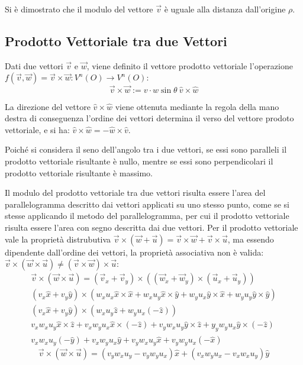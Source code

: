 \documentclass{article}
\numberwithin{equation}{subsection}
\begin{document}
Si è dimostrato che il modulo del vettore $\vec{v}$ è uguale alla distanza dall'origine $\rho$.

\subsection{Prodotto Vettoriale tra due Vettori}
Dati due vettori $\vec{v}$ e $\vec{w}$, viene definito il vettore prodotto vettoriale l'operazione $f(\vec{v},\vec{w})=\vec{v}\times\vec{w}:V^n(O)\to V^n(O)$: 
\begin{equation}
    \vec{v}\times\vec{w} := v\cdot w\sin\theta\:\hat{v}\times\hat{w}
\end{equation}
    
La direzione del vettore $\hat{v}\times\hat{w}$ viene ottenuta mediante la regola della mano destra
di conseguenza l'ordine dei vettori determina il verso del vettore prodoto vettoriale, e si ha: $\hat{v}\times\hat{w} = -\hat{w}\times\hat{v}$.



Poiché si considera il seno dell'angolo tra i due vettori, se essi sono paralleli il prodotto vettoriale risultante è nullo, mentre se essi 
sono perpendicolari il prodotto vettoriale risultante è massimo. 


Il modulo del prodotto vettoriale tra due vettori risulta essere l'area del 
parallelogramma descritto dai vettori applicati su uno stesso punto, come se si stesse applicando il metodo del parallelogramma, per cui 
il prodotto vettoriale risulta essere l'area con segno descritta dai due vettori. 
Per il prodotto vettoriale vale la proprietà distrubutiva 
$\vec{v}\times(\vec{w} +\vec{u}) = \vec{v}\times\vec{w} + \vec{v}\times\vec{u}$, 
ma essendo 
dipendente dall'ordine dei vettori, la proprietà associativa 
non è valida: 
$\vec{v}\times(\vec{w}\times\vec{u}) \neq (\vec{v}\times\vec{w})\times\vec{u}$:
\begin{gather*}
    \vec{v}\times(\vec{w}\times\vec{u})=(\vec{v}_x+\vec{v}_y)\times((\vec{w}_x+\vec{w}_y)\times(\vec{u}_x+\vec{u}_y))\\
    (v_x\hat{x}+v_y\hat{y})\times(w_xu_x\hat{x}\times\hat{x}+w_xu_y\hat{x}\times\hat{y}+w_yu_x\hat{y}\times\hat{x}+w_yu_y\hat{y}\times\hat{y})\\
    (v_x\hat{x}+v_y\hat{y})\times(w_xu_y\hat{z}+w_yu_x(-\hat{z}))\\
    v_xw_xu_y\hat{x}\times\hat{z}+v_xw_yu_x\hat{x}\times(-\hat{z})+v_yw_xu_y\hat{y}\times\hat{z}+y_yw_yu_x\hat{y}\times(-\hat{z})\\
    v_xw_xu_y(-\hat{y})+v_xw_yu_x\hat{y}+v_yw_xu_y\hat{x}+v_yw_yu_x(-\hat{x})
\end{gather*}
\begin{equation}
    \vec{v}\times(\vec{w}\times\vec{u})=(v_yw_xu_y-v_yw_yu_x)\hat{x}+(v_xw_yu_x-v_xw_xu_y)\hat{y}
\end{equation}
\end{document}
